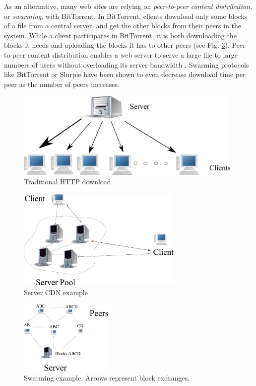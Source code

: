 As an alternative, many web sites are relying on \emph{peer-to-peer content distribution}, or \emph{swarming}, with BitTorrent.  In BitTorrent, clients download only some blocks of a file from a central server, and get the other blocks from their peers in the system.  While a client participates in BitTorrent, it is both downloading the blocks it needs and uploading the blocks it has to other peers (see Fig. \ref{fig:normal_swarm}).  Peer-to-peer content distribution enables a web server to serve a large file to large numbers of users without overloading its server bandwidth \cite{zappala}. Swarming protocols like BitTorrent \cite{cohen} or Slurpie \cite{slurpie} have been shown to even decrease download time per peer as the number of peers increases. 
\begin{figure}
\begin{center}
   \includegraphics[width=11cm]{pics/traditional_http.png}
    \caption{Traditional HTTP download}
 \label{fig:traditional_http}
 \end{center}
\end{figure}
\begin{figure}
    \centering
  \includegraphics[width=8cm]{pics/server_side_only.eps}
  \caption{Server CDN example}
  \label{fig:server_only}
\end{figure}   
\begin{figure}
 \centering
 \includegraphics[width=4.5cm]{pics/normal_swarm.eps}
 \caption{Swarming example.  Arrows represent block exchanges.}
 \label{fig:normal_swarm}
\end{figure}

